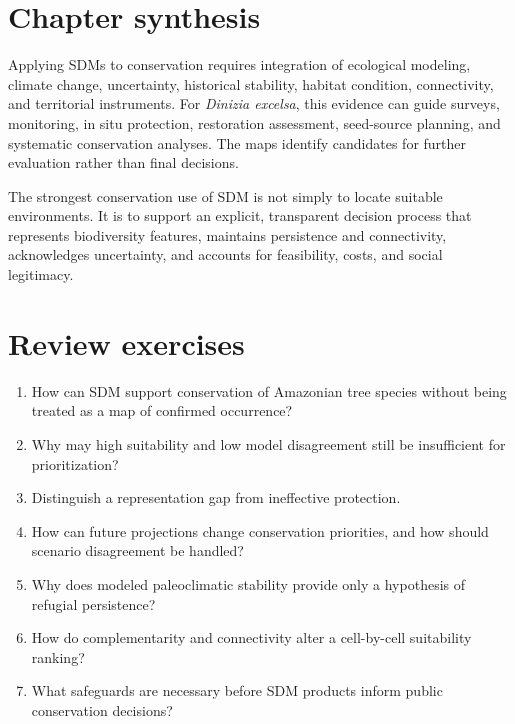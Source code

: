 
\section{Chapter synthesis}

Applying SDMs to conservation requires integration of ecological modeling, climate change, uncertainty, historical stability, habitat condition, connectivity, and territorial instruments. For \textit{Dinizia excelsa}, this evidence can guide surveys, monitoring, in situ protection, restoration assessment, seed-source planning, and systematic conservation analyses. The maps identify candidates for further evaluation rather than final decisions.

\begin{conceito}[title={\faBook\quad Key message}]
The strongest conservation use of SDM is not simply to locate suitable environments. It is to support an explicit, transparent decision process that represents biodiversity features, maintains persistence and connectivity, acknowledges uncertainty, and accounts for feasibility, costs, and social legitimacy.
\end{conceito}

\section{Review exercises}

\begin{enumerate}
\item How can SDM support conservation of Amazonian tree species without being treated as a map of confirmed occurrence?
\item Why may high suitability and low model disagreement still be insufficient for prioritization?
\item Distinguish a representation gap from ineffective protection.
\item How can future projections change conservation priorities, and how should scenario disagreement be handled?
\item Why does modeled paleoclimatic stability provide only a hypothesis of refugial persistence?
\item How do complementarity and connectivity alter a cell-by-cell suitability ranking?
\item What safeguards are necessary before SDM products inform public conservation decisions?
\end{enumerate}

